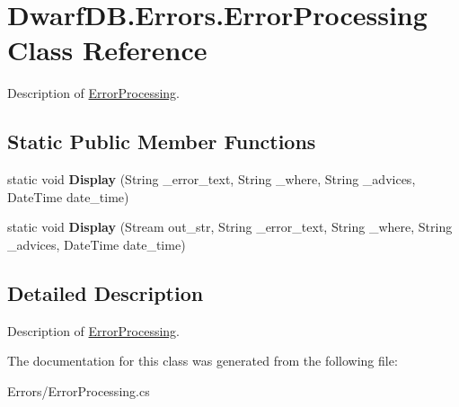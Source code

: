 \hypertarget{class_dwarf_d_b_1_1_errors_1_1_error_processing}{
\section{DwarfDB.Errors.ErrorProcessing Class Reference}
\label{class_dwarf_d_b_1_1_errors_1_1_error_processing}
}


Description of \hyperlink{class_dwarf_d_b_1_1_errors_1_1_error_processing}{ErrorProcessing}.  


\subsection*{Static Public Member Functions}
\begin{DoxyCompactItemize}
\item 
\hypertarget{class_dwarf_d_b_1_1_errors_1_1_error_processing_a68c6bfa1f5bf2da33703992cfed77731}{
static void {\bfseries Display} (String \_\-error\_\-text, String \_\-where, String \_\-advices, DateTime date\_\-time)}
\label{class_dwarf_d_b_1_1_errors_1_1_error_processing_a68c6bfa1f5bf2da33703992cfed77731}

\item 
\hypertarget{class_dwarf_d_b_1_1_errors_1_1_error_processing_aab993dd16fc5fb11db9ef496c6aa1980}{
static void {\bfseries Display} (Stream out\_\-str, String \_\-error\_\-text, String \_\-where, String \_\-advices, DateTime date\_\-time)}
\label{class_dwarf_d_b_1_1_errors_1_1_error_processing_aab993dd16fc5fb11db9ef496c6aa1980}

\end{DoxyCompactItemize}


\subsection{Detailed Description}
Description of \hyperlink{class_dwarf_d_b_1_1_errors_1_1_error_processing}{ErrorProcessing}. 

The documentation for this class was generated from the following file:\begin{DoxyCompactItemize}
\item 
Errors/ErrorProcessing.cs\end{DoxyCompactItemize}

